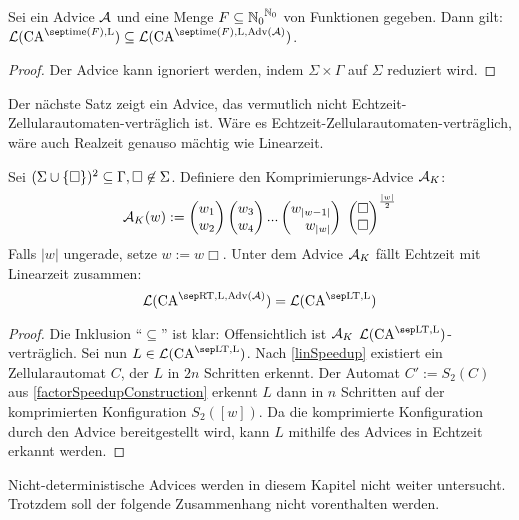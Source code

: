 \begin{lemma}
    \label{lemmaIgnoriereAdvice}
    Sei ein Advice $\mathcal{A}$ und eine Menge
    $F \subseteq {\mathbb{N}_0}^{\mathbb{N}_0}$ von Funktionen gegeben.
    Dann gilt: $\mathcal{L}(\CAM{ \mathrm{time}(F), \CALeft }) \subseteq  \mathcal{L}(\CAM{ \mathrm{time}(F), \CALeft, \orakel(\advA)})$.
\end{lemma}
\begin{proof}
    Der Advice kann ignoriert werden, indem $\Sigma \times \Gamma$ auf $\Sigma$ reduziert wird.
\end{proof}

Der nächste Satz zeigt ein Advice, das vermutlich nicht Echtzeit-Zellularautomaten-verträglich ist.
Wäre es Echtzeit-Zellularautomaten-verträglich, wäre auch Realzeit genauso mächtig wie Linearzeit.

\begin{satz}
    Sei $(\Sigma \cup \{ {\Box} \}) ^2 \subseteq \Gamma, \Box \not\in \Sigma$.
    Definiere den Komprimierungs-Advice $\mathcal{A}_K$:
    \[
        \advA_K(w) := 
                  \Spvek{w_1; w_2} \Spvek{w_3; w_4} ... \Spvek{w_{|w-1|}; w_{|w|}}
                        \; \Spvek{\Box; \Box}^\frac{|w|}{2}
    \]
    Falls $|w|$ ungerade, setze $w := w\Box$.
    Unter dem Advice $\mathcal{A}_K$ fällt Echtzeit mit Linearzeit zusammen:
    \[
        \CAL{\CART, \CALeft, \orakel({\advA})} = \CAL{\CALT, \CALeft}
    \]
\end{satz}
\begin{proof}
    Die Inklusion \enquote{$\subseteq$} ist klar: Offensichtlich ist $\mathcal{A}_K$ $\CAL{\CALT, \CALeft}$-verträglich.
    Sei nun $L \in \CAL{\CALT, \CALeft}$.
    Nach \cref{linSpeedup} existiert ein Zellularautomat $C$, der $L$ in $2n$ Schritten erkennt.
    Der Automat $C' := S_2(C)$ aus \cref{factorSpeedupConstruction}
    erkennt $L$ dann in $n$ Schritten auf der komprimierten Konfiguration $S_2([w])$.
    Da die komprimierte Konfiguration durch den Advice bereitgestellt wird, kann $L$ mithilfe des Advices in Echtzeit erkannt werden.
\end{proof}

Nicht-deterministische Advices werden in diesem Kapitel nicht weiter untersucht.
Trotzdem soll der folgende Zusammenhang nicht vorenthalten werden.

